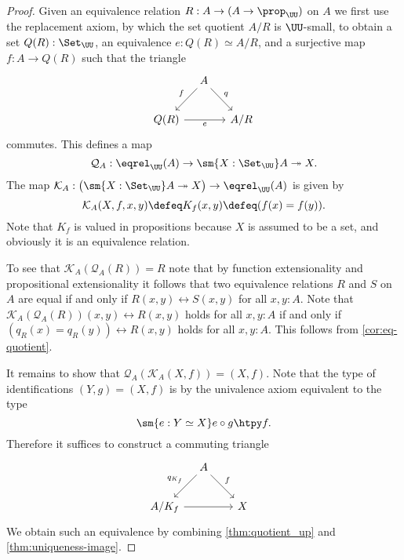 \begin{proof}
  Given an equivalence relation $R:A\to(A\to\prop_\UU)$ on $A$ we first use the replacement axiom, by which the set quotient $A/R$ is $\UU$-small, to obtain a set $Q(R):\Set_\UU$, an equivalence $e:Q(R)\simeq A/R$, and a surjective map $f:A\to Q(R)$ such that the triangle
  \begin{equation*}
    \begin{tikzcd}[column sep=1em]
      \phantom{Q(R)} & A \arrow[dl,swap,"f"] \arrow[dr,"q"] & \phantom{Q(R)}\\
      Q(R) \arrow[rr,swap,"e"] & & A/R
    \end{tikzcd}
  \end{equation*}
  commutes. This defines a map
  \begin{equation*}
    \mathcal{Q}_A:\eqrel_\UU(A)\to\sm{X:\Set_\UU}A\twoheadrightarrow X.
  \end{equation*}
  The map $\mathcal{K}_A:\big(\sm{X:\Set_\UU}A\twoheadrightarrow X\big)\to\eqrel_\UU(A)$ is given by
  \begin{equation*}
    \mathcal{K}_A(X,f,x,y)\defeq K_f(x,y) \defeq (f(x)=f(y)).
  \end{equation*}
  Note that $K_f$ is valued in propositions because $X$ is assumed to be a set, and obviously it is an equivalence relation.

  To see that $\mathcal{K}_A(\mathcal{Q}_A(R))=R$ note that by function extensionality and propositional extensionality it follows that two equivalence relations $R$ and $S$ on $A$ are equal if and only if $R(x,y)\leftrightarrow S(x,y)$ for all $x,y:A$. Note that $\mathcal{K}_A(\mathcal{Q}_A(R))(x,y)\leftrightarrow R(x,y)$ holds for all $x,y:A$ if and only if $(q_R(x)=q_R(y))\leftrightarrow R(x,y)$ holds for all $x,y:A$. This follows from \cref{cor:eq-quotient}.

  It remains to show that $\mathcal{Q}_A(\mathcal{K}_A(X,f))=(X,f)$. Note that the type of identifications $(Y,g)=(X,f)$ is by the univalence axiom equivalent to the type
  \begin{equation*}
    \sm{e:Y\simeq X}e\circ g\htpy f.
  \end{equation*}
  Therefore it suffices to construct a commuting triangle
  \begin{equation*}
    \begin{tikzcd}[column sep=1em]
      \phantom{A/K_f} & A \arrow[dl,swap,"q_{K_f}"] \arrow[dr,"f"] & \phantom{A/K_f} \\
      A/K_f \arrow[rr] & & X
    \end{tikzcd}
  \end{equation*}
  We obtain such an equivalence by combining \cref{thm:quotient_up} and \cref{thm:uniqueness-image}.
\end{proof}


